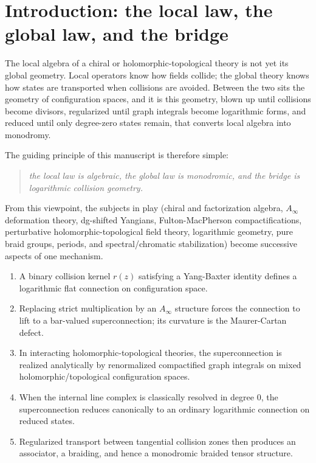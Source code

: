 \section{Introduction: the local law, the global law, and the bridge}

The local algebra of a chiral or holomorphic-topological theory is not yet its global geometry. Local operators know how fields collide; the global theory knows how states are transported when collisions are avoided. Between the two sits the geometry of configuration spaces, and it is this geometry, blown up until collisions become divisors, regularized until graph integrals become logarithmic forms, and reduced until only degree-zero states remain, that converts local algebra into monodromy.

The guiding principle of this manuscript is therefore simple:
\begin{quote}
\emph{the local law is algebraic, the global law is monodromic, and the bridge is logarithmic collision geometry.}
\end{quote}

From this viewpoint, the subjects in play (chiral and factorization algebra, $A_\infty$ deformation theory, dg-shifted Yangians, Fulton-MacPherson compactifications, perturbative holomorphic-topological field theory, logarithmic geometry, pure braid groups, periods, and spectral/chromatic stabilization) become successive aspects of one mechanism.
\begin{enumerate}[label=\textup{(\arabic*)}]
 \item A binary collision kernel $r(z)$ satisfying a Yang-Baxter identity defines a logarithmic flat connection on configuration space.
 \item Replacing strict multiplication by an $A_\infty$ structure forces the connection to lift to a bar-valued superconnection; its curvature is the Maurer-Cartan defect.
 \item In interacting holomorphic-topological theories, the superconnection is realized analytically by renormalized compactified graph integrals on mixed holomorphic/topological configuration spaces.
 \item When the internal line complex is classically resolved in degree $0$, the superconnection reduces canonically to an ordinary logarithmic connection on reduced states.
 \item Regularized transport between tangential collision zones then produces an associator, a braiding, and hence a monodromic braided tensor structure.
\end{enumerate}

